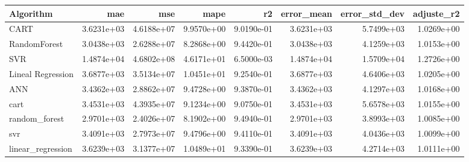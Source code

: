 \begin{tabular}{lrrrrrrr}
\toprule
Algorithm & mae & mse & mape & r2 & error_mean & error_std_dev & adjuste_r2 \\
\midrule
CART & 3.6231e+03 & 4.6188e+07 & 9.9570e+00 & 9.0190e-01 & 3.6231e+03 & 5.7499e+03 & 1.0269e+00 \\
RandomForest & 3.0438e+03 & 2.6288e+07 & 8.2868e+00 & 9.4420e-01 & 3.0438e+03 & 4.1259e+03 & 1.0153e+00 \\
SVR & 1.4874e+04 & 4.6802e+08 & 4.6171e+01 & 6.5000e-03 & 1.4874e+04 & 1.5709e+04 & 1.2726e+00 \\
Lineal Regression & 3.6877e+03 & 3.5134e+07 & 1.0451e+01 & 9.2540e-01 & 3.6877e+03 & 4.6406e+03 & 1.0205e+00 \\
ANN & 3.4362e+03 & 2.8862e+07 & 9.4728e+00 & 9.3870e-01 & 3.4362e+03 & 4.1297e+03 & 1.0168e+00 \\
cart & 3.4531e+03 & 4.3935e+07 & 9.1234e+00 & 9.0750e-01 & 3.4531e+03 & 5.6578e+03 & 1.0155e+00 \\
random_forest & 2.9701e+03 & 2.4026e+07 & 8.1902e+00 & 9.4940e-01 & 2.9701e+03 & 3.8993e+03 & 1.0085e+00 \\
svr & 3.4091e+03 & 2.7973e+07 & 9.4796e+00 & 9.4110e-01 & 3.4091e+03 & 4.0436e+03 & 1.0099e+00 \\
linear_regression & 3.6239e+03 & 3.1377e+07 & 1.0489e+01 & 9.3390e-01 & 3.6239e+03 & 4.2714e+03 & 1.0111e+00 \\
\bottomrule
\end{tabular}
